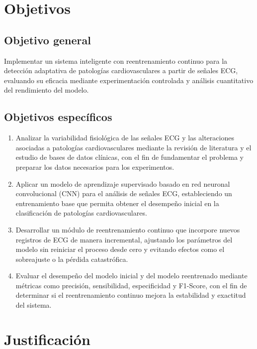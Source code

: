 \documentclass[11pt,spanish]{citedi}
\begin{document}
\section{Objetivos}

\subsection{Objetivo general}

Implementar un sistema inteligente con reentrenamiento continuo para la detección adaptativa de patologías cardiovasculares a partir de señales ECG, evaluando su eficacia mediante experimentación controlada y análisis cuantitativo del rendimiento del modelo.

\subsection{Objetivos específicos}

\begin{enumerate}
\item Analizar la variabilidad fisiológica de las señales ECG y las alteraciones asociadas a patologías cardiovasculares mediante la revisión de literatura y el estudio de bases de datos clínicas, con el fin de fundamentar el problema y preparar los datos necesarios para los experimentos.

\item Aplicar un modelo de aprendizaje supervisado basado en red neuronal convolucional (CNN) para el análisis de señales ECG, estableciendo un entrenamiento base que permita obtener el desempeño inicial en la clasificación de patologías cardiovasculares.

\item Desarrollar un módulo de reentrenamiento continuo que incorpore nuevos registros de ECG de manera incremental, ajustando los parámetros del modelo sin reiniciar el proceso desde cero y evitando efectos como el sobreajuste o la pérdida catastrófica.

\item Evaluar el desempeño del modelo inicial y del modelo reentrenado mediante métricas como precisión, sensibilidad, especificidad y F1-Score, con el fin de determinar si el reentrenamiento continuo mejora la estabilidad y exactitud del sistema.
\end{enumerate}

\section{Justificación}
\end{document}

